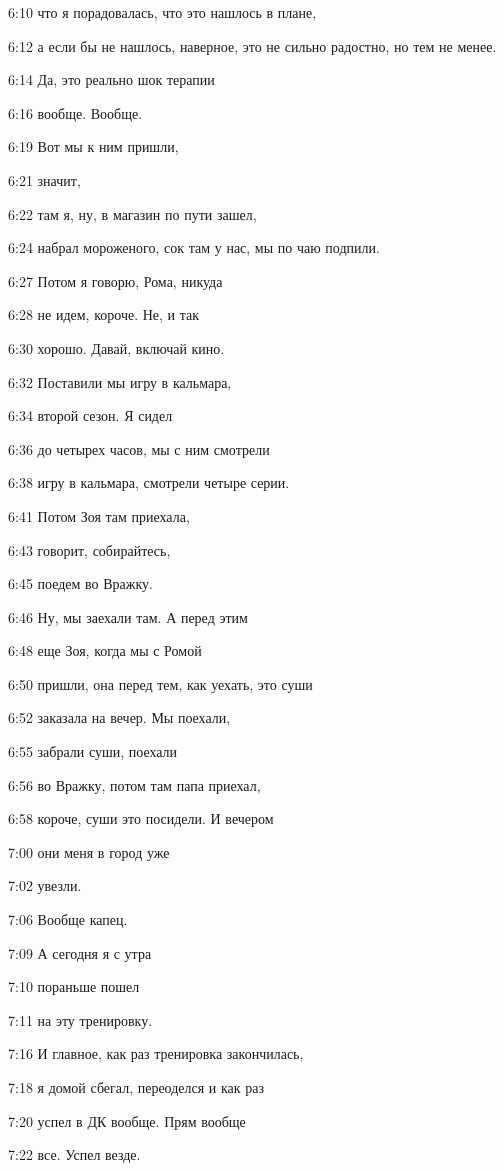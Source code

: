 6:10
что я порадовалась, что это нашлось в плане,

6:12
а если бы не нашлось, наверное, это не сильно радостно, но тем не менее.

6:14
Да, это реально шок терапии

6:16
вообще. Вообще.

6:19
Вот мы к ним пришли,

6:21
значит,

6:22
там я, ну, в магазин по пути зашел,

6:24
набрал мороженого, сок там у нас, мы по чаю подпили.

6:27
Потом я говорю, Рома, никуда

6:28
не идем, короче. Не, и так

6:30
хорошо. Давай, включай кино.

6:32
Поставили мы игру в кальмара,

6:34
второй сезон. Я сидел

6:36
до четырех часов, мы с ним смотрели

6:38
игру в кальмара, смотрели четыре серии.

6:41
Потом Зоя там приехала,

6:43
говорит, собирайтесь,

6:45
поедем во Вражку.

6:46
Ну, мы заехали там. А перед этим

6:48
еще Зоя, когда мы с Ромой

6:50
пришли, она перед тем, как уехать, это суши

6:52
заказала на вечер. Мы поехали,

6:55
забрали суши, поехали

6:56
во Вражку, потом там папа приехал,

6:58
короче, суши это посидели. И вечером

7:00
они меня в город уже

7:02
увезли.

7:06
Вообще капец.

7:09
А сегодня я с утра

7:10
пораньше пошел

7:11
на эту тренировку.

7:16
И главное, как раз тренировка закончилась,

7:18
я домой сбегал, переоделся и как раз

7:20
успел в ДК вообще. Прям вообще

7:22
все. Успел везде.

